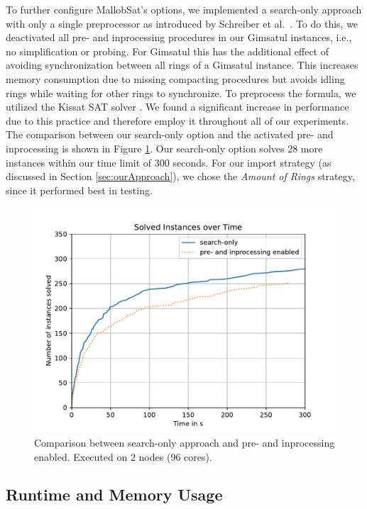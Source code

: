 \documentclass[12pt,a4paper,twoside]{scrartcl}
\numberwithin{equation}{section}
\begin{document}
To further configure MallobSat's options, we implemented a search-only approach with only a single preprocessor as introduced by Schreiber et al.~\cite{searchOnlyPaper}. To do this, we deactivated all pre- and inprocessing procedures in our Gimsatul instances, i.e., no simplification or probing. For Gimsatul this has the additional effect of avoiding synchronization between all rings of a Gimsatul instance. This increases memory consumption due to missing compacting procedures but avoids idling rings while waiting for other rings to synchronize. To preprocess the formula, we utilized the Kissat SAT solver \cite{kissat}.
We found a significant increase in performance due to this practice and therefore employ it throughout all of our experiments. The comparison between our search-only option and the activated pre- and inprocessing is shown in Figure \ref{fig:searchOnlyBoost}. Our search-only option solves 28 more instances within our time limit of 300 seconds. For our import strategy (as discussed in Section \ref{sec:ourApproach}), we chose the \textit{Amount of Rings} strategy, since it performed best in testing.

\begin{figure}[!h]
  \center
  \includegraphics[scale=.45]{plots/config_compare/search_only_compare.pdf}
  \caption{Comparison between search-only approach and pre- and inprocessing enabled. Executed on 2 nodes (96 cores).}
  \label{fig:searchOnlyBoost}
\end{figure}

\subsection{Runtime and Memory Usage}
\end{document}
